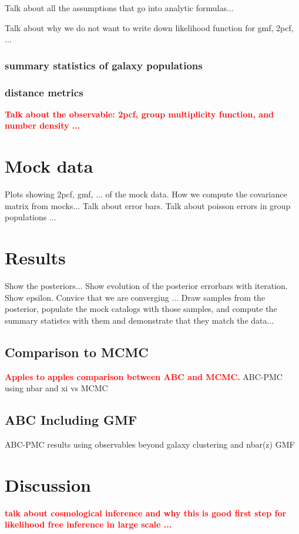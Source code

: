 \documentclass[12pt, preprint]{aastex}
\newcommand{\todo}[1]{{\bf \textcolor{red}{ #1}}}
\begin{document}
Talk about all the assumptions that go into analytic formulas...

Talk about why we do not want to write down likelihood function for gmf, 2pcf, ...
\subsubsection{summary statistics of galaxy populations}

\subsubsection{distance metrics}


\todo{Talk about the observable: 2pcf, group multiplicity function, and number density ...}


\section{Mock data}\label{sec:data}

Plots showing 2pcf, gmf, ... of the mock data.
How we compute the covariance matrix from mocks...
Talk about error bars. Talk about poisson errors in group populations ... 

\section{Results}\label{sec:results}
Show the posteriors...
Show evolution of the posterior errorbars with iteration. Show epsilon. Convice that we are converging ...
Draw samples from the posterior, populate the mock catalogs with those samples, and compute the summary statistcs with them 
and demonstrate that they match the data...

\subsection{Comparison to MCMC}
\todo{Apples to apples comparison between ABC and MCMC.}
ABC-PMC using nbar and xi vs MCMC

\subsection{ABC Including GMF}
ABC-PMC results using observables beyond galaxy clustering and nbar(z) GMF

\section{Discussion}\label{sec:discussion}
\todo{talk about cosmological inference and why this is good first step for likelihood free inference in large scale ...}
\end{document}
